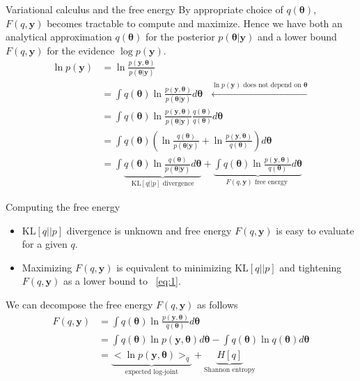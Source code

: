 \documentclass[10pt,mathserif]{beamer}
\begin{document}
\begin{frame}{Variational calculus and the free energy}
By appropriate choice of $q(\bm{\theta})$, $F(q,\bm{y})$ becomes tractable to compute and maximize. Hence we have both an analytical approximation $q(\bm{\theta})$ for the posterior $p(\bm{\theta}|\bm{y})$ and a lower bound $F(q,\bm{y})$ for the evidence $\log p(\bm{y})$.
\bigskip
\begin{equation}\label{eq:1}
    \begin{split}
        \ln p(\bm{y})
        & = \ln \frac{p(\bm{y},\bm{\theta})}{p(\bm{\theta}|\bm{y})}\\
        & = \int q(\bm{\theta}) \ln \frac{p(\bm{y},\bm{\theta})}{p(\bm{\theta}|\bm{y})} d\bm{\theta} \ \ \ \xleftarrow{\ln p(\bm{y})\text{ does not depend on }\bm{\theta}}\\
        & = \int q(\bm{\theta}) \ln \frac{p(\bm{y},\bm{\theta})}{p(\bm{\theta}|\bm{y})} \frac{q(\bm{\theta})}{q(\bm{\theta})}d\bm{\theta} \\
        & = \int q(\bm{\theta}) (\ln \frac{q(\bm{\theta})}{p(\bm{\theta}|\bm{y})} + \ln \frac{p(\bm{y},\bm{\theta})}{q(\bm{\theta})})d\bm{\theta} \\        
        & = \int \underbrace{ q(\bm{\theta}) \ln \frac{q(\bm{\theta})}{p(\bm{\theta}|\bm{y})}d\bm{\theta}}_{\mbox{KL}[q||p] \text{ divergence}} +  \underbrace{\int q(\bm{\theta})\ln\frac{p(\bm{y},\bm{\theta})}{q(\bm{\theta})}d\bm{\theta}}_{F(q,\bm{y}) \text{ free energy }}
    \end{split}
\end{equation}
\end{frame}

\begin{frame}{Computing the free energy}
\begin{itemize}
    \item $\mbox{KL}[q||p]$ divergence is unknown and free energy $F(q,\bm{y})$ is easy to evaluate for a given $q$.
    \item Maximizing $F(q,\bm{y})$ is equivalent to minimizing $\mbox{KL}[q||p]$ and tightening $F(q,\bm{y})$ as a lower bound to ~\eqref{eq:1}.
\end{itemize}
\bigskip
We can decompose the free energy $F(q,\bm{y})$ as follows
\begin{equation}
    \begin{split}
        F(q,\bm{y}) 
        & = \int q(\bm{\theta})\ln\frac{p(\bm{y},\bm{\theta})}{q(\bm{\theta})}d\bm{\theta}\\
        & = \int q(\bm{\theta}) \ln p(\bm{y},\bm{\theta})d\bm{\theta} - \int q(\bm{\theta}) \ln q(\bm{\theta}) d\bm{\theta}\\
        & = \underbrace{<\ln p(\bm{y},\bm{\theta})>_q}_{\text{expected log-joint}} + \underbrace{H[q]}_{\text{Shannon entropy}}
    \end{split}
\end{equation}
\end{frame}
\end{document}
